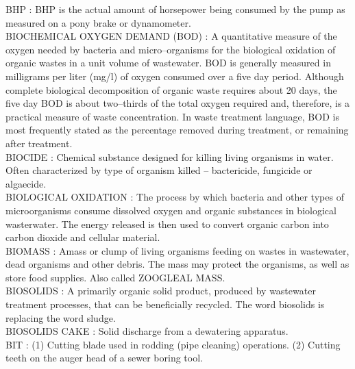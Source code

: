 \vspace{0.15cm}
BHP :   BHP is the actual amount of horsepower being consumed by the pump as measured on a pony brake or dynamometer.\\
\vspace{0.15cm}
BIOCHEMICAL OXYGEN DEMAND (BOD) :   A quantitative measure of the oxygen needed by bacteria and micro–organisms for the biological oxidation of organic wastes in a unit volume of wastewater. BOD is generally measured in milligrams per liter (mg/l) of oxygen consumed over a five day period. Although complete biological decomposition of organic waste requires about 20 days, the five day BOD is about two–thirds of the total oxygen required and, therefore, is a practical measure of waste concentration. In waste treatment language, BOD is most frequently stated as the percentage removed during treatment, or remaining after treatment.\\
\vspace{0.15cm}
BIOCIDE :  Chemical substance designed for killing living organisms in water. Often characterized by type of organism killed – bactericide, fungicide or algaecide.\\
\vspace{0.15cm}
BIOLOGICAL OXIDATION :   The process by which bacteria and other types of microorganisms consume dissolved oxygen and organic substances in biological wasterwater.  The energy released is then used to convert organic carbon into carbon dioxide and cellular material. \\
\vspace{0.15cm}
BIOMASS :  Amass or clump of living organisms feeding on wastes in wastewater, dead organisms and other debris. The mass may protect the organisms, as well as store food supplies. Also called ZOOGLEAL MASS.\\
\vspace{0.15cm}
BIOSOLIDS :  A primarily organic solid product, produced by wastewater treatment processes, that can be beneficially recycled. The word biosolids is replacing the word sludge.\\
\vspace{0.15cm}
BIOSOLIDS CAKE :  Solid discharge from a dewatering apparatus. \\
\vspace{0.15cm}
BIT :  (1) Cutting blade used in rodding (pipe cleaning) operations. (2) Cutting teeth on the auger head of a sewer boring tool. \\
\vspace{0.15cm}
